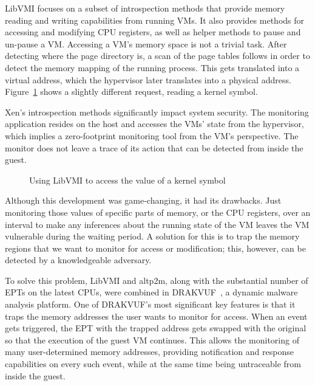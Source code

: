 \par LibVMI focuses on a subset of introspection methods that provide memory reading and writing capabilities from running \ac{VM}s. It also provides methods for accessing and modifying \ac{CPU} registers, as well as helper methods to pause and un-pause a \ac{VM}. Accessing a \ac{VM}'s memory space is not a trivial task. After detecting where the page directory is, a scan of the page tables follows in order to detect the memory mapping of the running process. This gets translated into a virtual address, which the hypervisor later translates into a physical address. Figure~\ref{fig:accesskernel} shows a slightly different request, reading a kernel symbol.

\par Xen’s introspection methods significantly impact system security. The monitoring application resides on the host and accesses the \ac{VM}s' state from the hypervisor, which implies a zero-footprint monitoring tool from the \ac{VM}'s perspective. The monitor does not leave a trace of its action that can be detected from inside the guest.

\begin{figure}[ht]
	\centering
	
	\caption{Using LibVMI to access the value of a kernel symbol}
	\label{fig:accesskernel}
\end{figure}

\par Although this development was game-changing, it had its drawbacks. Just monitoring those values of specific parts of memory, or the \ac{CPU} registers, over an interval to make any inferences about the running state of the \ac{VM} leaves the \ac{VM} vulnerable during the waiting period. A solution for this is to trap the memory regions that we want to monitor for access or modification; this, however, can be detected by a knowledgeable adversary. 

\par To solve this problem, LibVMI and altp2m, along with the substantial number of \ac{EPT}s on the latest \ac{CPU}s, were combined in DRAKVUF~\cite{lengyel2014drakvuf}, a dynamic malware analysis platform. One of DRAKVUF's most significant key features is that it traps the memory addresses the user wants to monitor for access. When an event gets triggered, the \ac{EPT} with the trapped address gets swapped with the original so that the execution of the guest \ac{VM} continues. This allows the monitoring of many user-determined memory addresses, providing notification and response capabilities on every such event, while at the same time being untraceable from inside the guest.


